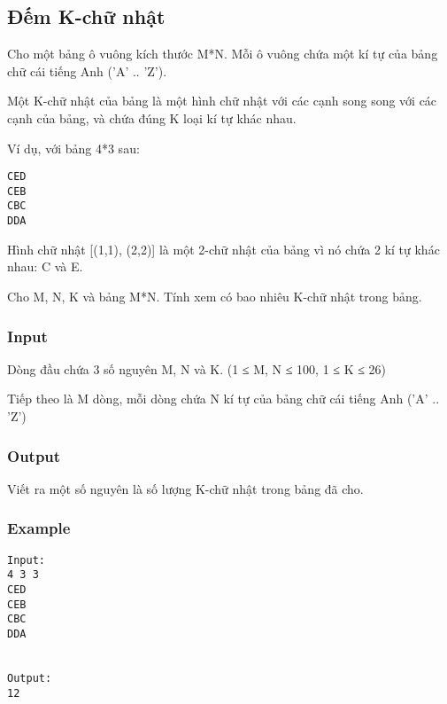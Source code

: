



\subsection{   Đếm K-chữ nhật  }

   Cho một bảng ô vuông kích thước M*N. Mỗi ô vuông chứa một kí tự của bảng chữ cái tiếng Anh ('A' .. 'Z').  

   Một K-chữ nhật của bảng là một hình chữ nhật với các cạnh song song với các cạnh của bảng, và chứa đúng K loại kí tự khác nhau.  

   Ví dụ, với bảng 4*3 sau:  
\begin{verbatim}
CED
CEB
CBC
DDA
\end{verbatim}

   Hình chữ nhật [(1,1), (2,2)] là một 2-chữ nhật của bảng vì nó chứa 2 kí tự khác nhau: C và E.  

   Cho M, N, K và bảng M*N. Tính xem có bao nhiêu K-chữ nhật trong bảng.  

\subsubsection{   Input  }

   Dòng đầu chứa 3 số nguyên M, N và K. (1 ≤ M, N ≤ 100, 1 ≤ K ≤ 26)  

   Tiếp theo là M dòng, mỗi dòng chứa N kí tự của bảng chữ cái tiếng Anh ('A' .. 'Z')  

\subsubsection{   Output  }

   Viết ra một số nguyên là số lượng K-chữ nhật trong bảng đã cho.  

\subsubsection{   Example  }
\begin{verbatim}
Input:
4 3 3
CED
CEB
CBC
DDA


Output:
12

\end{verbatim}